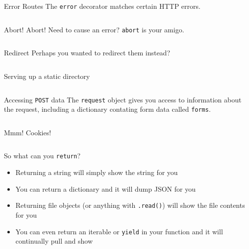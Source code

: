 \documentclass{lug}
\begin{document}
\begin{frame}{Error Routes}
    The \texttt{error} decorator matches certain HTTP errors.

    \medskip

    \inputminted{python3}{examples/route_error.py}
\end{frame}

\begin{frame}{Abort! Abort!}
    Need to cause an error? \texttt{abort} is your amigo.

    \inputminted{python3}{examples/abort.py}
\end{frame}

\begin{frame}{Redirect}
    Perhaps you wanted to redirect them instead?

    \inputminted{python3}{examples/redirect.py}
\end{frame}

\begin{frame}{Serving up a static directory}
    \inputminted{python3}{examples/static_files.py}
\end{frame}

\begin{frame}{Accessing \texttt{POST} data}
    The \texttt{request} object gives you access to information about the
    request, including a dictionary contating form data called \texttt{forms}.

    \inputminted{python3}{examples/form_data.py}
\end{frame}

\begin{frame}{Mmm! Cookies!}
    \inputminted{python3}{examples/cookies.py}
\end{frame}

\begin{frame}{So what can you \texttt{return}?}
    \begin{itemize}[<+->]
        \item Returning a string will simply show the string for you
        \item You can return a dictionary and it will dump JSON for you
        \item Returning file objects (or anything with \texttt{.read()}) will
            show the file contents for you
        \item You can even return an iterable or \texttt{yield} in your
            function and it will continually pull and show
    \end{itemize}
\end{frame}
\end{document}
